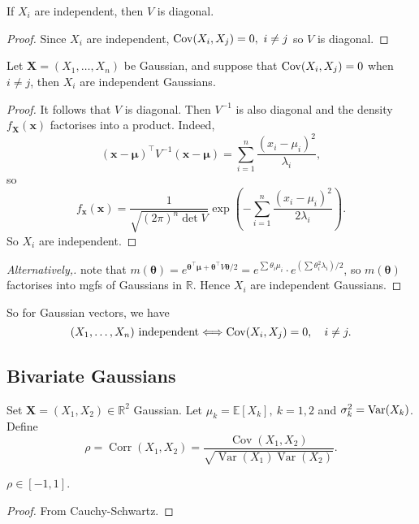 \begin{lemma}
    If $X_i$ are independent, then $V$ is diagonal.
\end{lemma}
\begin{proof}
    Since $X_i$ are independent, $ \operatorname{Cov}(X_i,X_j)=0,\ i\neq j $ so $ V $ is diagonal.
\end{proof}
\begin{proposition}
    Let $\mathbf{X}=(X_1,\ldots,X_n)$ be Gaussian, and suppose that $\operatorname{Cov}(X_i,X_j)=0$ when $i\neq j$, then $X_i$ are independent Gaussians.
\end{proposition}
\begin{proof}
    It follows that $V$ is diagonal. Then $V^{-1}$ is also diagonal and the density $ f_{\mathbf{X}}(\mathbf{x}) $ factorises into a product. Indeed,
    \[
        (\mathbf{x}-\boldsymbol{\mu})^\top V^{-1} (\mathbf{x}-\boldsymbol{\mu}) = \sum_{i=1}^{n}\frac{(x_i-\mu_i)^2}{\lambda_i},
    \]
    so 
    \[
        f_{\mathbf{x}}(\mathbf{x}) = \frac{1}{\sqrt{(2\pi)^n\det V}} \exp \left( - \sum_{i=1}^{n}\frac{(x_i-\mu_i)^2}{2\lambda_i}\right).
    \]
    So $X_i$ are independent.
\end{proof}
\begin{proof}[Alternatively,]
    note that $ m(\boldsymbol{\theta})=e^{\boldsymbol{\theta}^\top \boldsymbol{\mu}+ \boldsymbol{\theta}^\top V \boldsymbol{\theta}/2} = e^{\sum \theta_i \mu_i} \cdot e^{(\sum \theta_i^2 \lambda_i)/2} $, so $ m(\boldsymbol{\theta}) $ factorises into mgfs of Gaussians in $\mathbb{R}$. Hence $ X_i $ are independent Gaussians.
\end{proof}

So for Gaussian vectors, we have 
\[
    (X_1,\dots,X_n) \text{ independent} \Longleftrightarrow \operatorname{Cov}(X_i,X_j)=0,\quad i\neq j.
\]

\subsection{Bivariate Gaussians}
Set $ \mathbf{X}=(X_1,X_2)\in \mathbb{R}^{2} $ Gaussian. Let $ \mu_k=\mathbb{E}[X_k],\ k=1,2 $ and $ \sigma_k^2 = \operatorname{Var}(X_k) $. Define
$$\rho=\operatorname{Corr}(X_1,X_2)=\frac{\operatorname{Cov}(X_1,X_2)}{\sqrt{\operatorname{Var}(X_1)\operatorname{Var}(X_2)}}.$$

\begin{claim}
    $ \rho\in [-1,1] $.
\end{claim}
\begin{proof}
    From Cauchy-Schwartz.
\end{proof}

